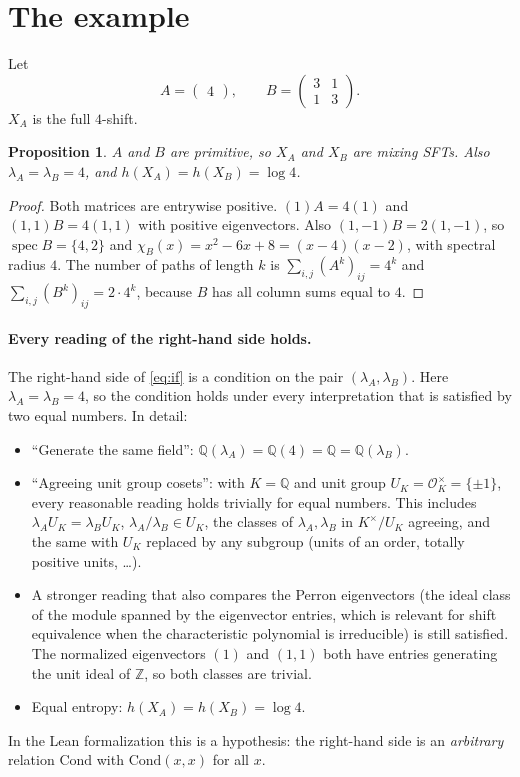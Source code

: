 \documentclass[11pt]{article}
\newtheorem{proposition}[theorem]{Proposition}
\theoremstyle{definition}
\theoremstyle{remark}
\newcommand{\Z}{\mathbb{Z}}
\newcommand{\Q}{\mathbb{Q}}
\begin{document}
\section{The example}
Let
\[
A=\begin{pmatrix}4\end{pmatrix},\qquad B=\begin{pmatrix}3&1\\1&3\end{pmatrix}.
\]
$X_A$ is the full $4$-shift.

\begin{proposition}\label{prop:same}
$A$ and $B$ are primitive, so $X_A$ and $X_B$ are mixing SFTs. Also
$\lambda_A=\lambda_B=4$, and $h(X_A)=h(X_B)=\log4$.
\end{proposition}
\begin{proof}
Both matrices are entrywise positive. $(1)A=4(1)$ and $(1,1)B=4(1,1)$ with positive
eigenvectors. Also $(1,-1)B=2(1,-1)$, so $\operatorname{spec}B=\{4,2\}$ and
$\chi_B(x)=x^2-6x+8=(x-4)(x-2)$, with spectral radius $4$. The number of paths of
length $k$ is $\sum_{i,j}(A^k)_{ij}=4^k$ and $\sum_{i,j}(B^k)_{ij}=2\cdot4^k$,
because $B$ has all column sums equal to $4$.
\end{proof}

\paragraph{Every reading of the right-hand side holds.} The right-hand side of
\eqref{eq:if} is a condition on the pair $(\lambda_A,\lambda_B)$. Here
$\lambda_A=\lambda_B=4$, so the condition holds under every interpretation that is
satisfied by two equal numbers. In detail:
\begin{itemize}
\item ``Generate the same field'': $\Q(\lambda_A)=\Q(4)=\Q=\Q(\lambda_B)$.
\item ``Agreeing unit group cosets'': with $K=\Q$ and unit group
$U_K=\mathcal O_K^\times=\{\pm1\}$, every reasonable reading holds trivially for equal
numbers. This includes $\lambda_AU_K=\lambda_BU_K$, $\lambda_A/\lambda_B\in U_K$, the
classes of $\lambda_A,\lambda_B$ in $K^\times/U_K$ agreeing, and the same with $U_K$
replaced by any subgroup (units of an order, totally positive units, \dots).
\item A stronger reading that also compares the Perron eigenvectors (the ideal class
of the module spanned by the eigenvector entries, which is relevant for shift
equivalence when the characteristic polynomial is irreducible) is still satisfied. The normalized
eigenvectors $(1)$ and $(1,1)$ both have entries generating the unit ideal of $\Z$,
so both classes are trivial.
\item Equal entropy: $h(X_A)=h(X_B)=\log4$.
\end{itemize}
In the Lean formalization this is a hypothesis: the right-hand side is an
\emph{arbitrary} relation $\mathrm{Cond}$ with $\mathrm{Cond}(x,x)$ for all $x$.
\end{document}
